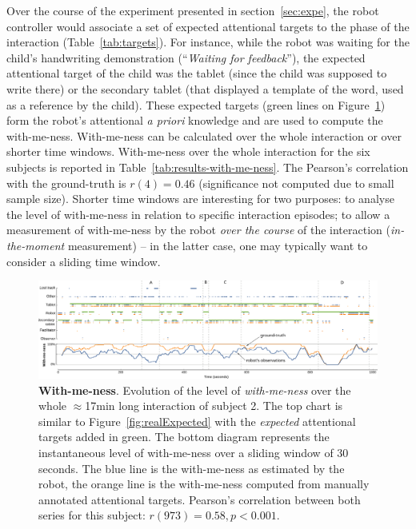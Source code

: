 \documentclass{sig-alternate}
\begin{document}
Over the course of the experiment presented in section~\ref{sec:expe}, the robot
controller would associate a set of expected attentional targets to the phase of
the interaction (Table~\ref{tab:targets}). For instance, while the robot was
waiting for the child's handwriting demonstration (``\textit{Waiting for
feedback}''), the expected attentional target of the child was the tablet (since
the child was supposed to write there) or the secondary tablet (that displayed a
template of the word, used as a reference by the child). These expected targets
(green lines on Figure~\ref{fig:with-me-ness}) form the robot's attentional {\it
a priori} knowledge and are used to compute the with-me-ness. With-me-ness can
be calculated over the whole interaction or over shorter time windows.
With-me-ness over the whole interaction for the six subjects is reported in
Table~\ref{tab:results-with-me-ness}. The Pearson's correlation with the
ground-truth is $r(4)=0.46$ (significance not computed due to small sample
size). Shorter time windows are interesting for two purposes: to analyse the
level of with-me-ness in relation to specific interaction episodes; to allow a
measurement of with-me-ness by the robot \emph{over the course} of the
interaction (\emph{in-the-moment} measurement) -- in the latter case, one may
typically want to consider a sliding time window.

\begin{figure}
    \centering
    \includegraphics[width=\linewidth]{with-me-ness}
    \caption{\small \textbf{With-me-ness}. Evolution of the level of
        \emph{with-me-ness} over the whole $\approx$17min long interaction of
        subject 2. The top chart is similar to Figure~\ref{fig:realExpected}
        with the \emph{expected} attentional targets added in green. The bottom
        diagram represents the instantaneous level of with-me-ness over a
        sliding window of 30 seconds. The blue line is the with-me-ness as estimated
        by the robot, the orange line is the with-me-ness computed from manually
        annotated attentional targets.  Pearson's correlation between both
        series for this subject: $r(973)=0.58, p < 0.001$.}

    \label{fig:with-me-ness}
\end{figure}
\end{document}
